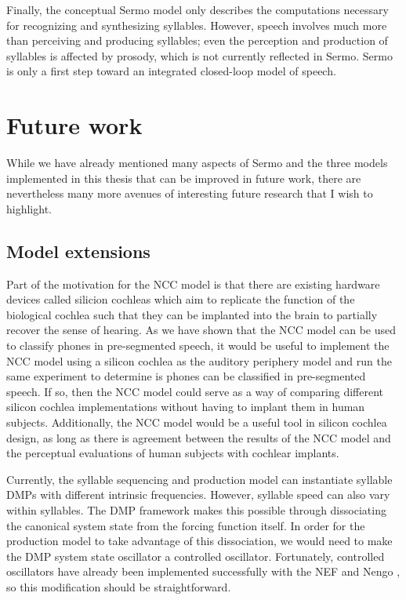 Finally, the conceptual Sermo model
only describes the computations necessary
for recognizing and synthesizing syllables.
However, speech involves much more
than perceiving and producing syllables;
even the perception and production of syllables
is affected by prosody,
which is not currently reflected in Sermo.
Sermo is only a first step toward
an integrated closed-loop model
of speech.

\section{Future work}

While we have already mentioned many
aspects of Sermo and the three models
implemented in this thesis
that can be improved in future work,
there are nevertheless many more
avenues of interesting future research
that I wish to highlight.

\subsection{Model extensions}

Part of the motivation for the NCC model
is that there are existing hardware devices
called silicion cochleas
which aim to replicate the function
of the biological cochlea
such that they can be implanted
into the brain to partially recover the sense of hearing.
As we have shown that the NCC model
can be used to classify phones
in pre-segmented speech,
it would be useful to
implement the NCC model using
a silicon cochlea
as the auditory periphery model
and run the same experiment
to determine is phones can be classified
in pre-segmented speech.
If so, then the NCC model could serve
as a way of comparing different
silicon cochlea implementations
without having to implant them
in human subjects.
Additionally, the NCC model
would be a useful tool in silicon cochlea design,
as long as there is agreement
between the results of the NCC model
and the perceptual evaluations
of human subjects
with cochlear implants.

Currently, the syllable sequencing and production model
can instantiate syllable DMPs with different
intrinsic frequencies.
However, syllable speed can also vary within syllables.
The DMP framework makes this possible through
dissociating the canonical system state
from the forcing function itself.
In order for the production model to take advantage
of this dissociation,
we would need to make the DMP system state oscillator
a controlled oscillator.
Fortunately, controlled oscillators
have already been implemented successfully
with the NEF and Nengo \citep{bekolay2013},
so this modification should be straightforward.

